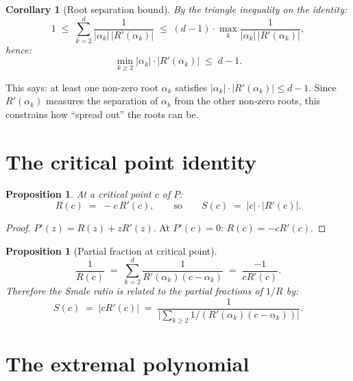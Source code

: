 \documentclass[11pt,a4paper]{article}
\newtheorem{proposition}[theorem]{Proposition}
\newtheorem{corollary}[theorem]{Corollary}
\begin{document}
\begin{corollary}[Root separation bound]
By the triangle inequality on the identity:
\begin{equation}
1 \;\le\; \sum_{k=2}^d \frac{1}{|\alpha_k|\, |R'(\alpha_k)|} \;\le\; (d - 1) \cdot \max_k \frac{1}{|\alpha_k|\, |R'(\alpha_k)|},
\end{equation}
hence:
\begin{equation}
\boxed{\min_{k \ge 2} |\alpha_k| \cdot |R'(\alpha_k)| \;\le\; d - 1.}
\end{equation}
\end{corollary}

This says: at least one non-zero root $\alpha_k$ satisfies $|\alpha_k| \cdot |R'(\alpha_k)| \le d - 1$. Since $R'(\alpha_k)$ measures the separation of $\alpha_k$ from the other non-zero roots, this constrains how ``spread out'' the roots can be.

\section{The critical point identity}

\begin{proposition}
At a critical point $c$ of $P$:
\begin{equation}
R(c) \;=\; -c \, R'(c), \qquad \text{so} \qquad S(c) \;=\; |c| \cdot |R'(c)|.
\end{equation}
\end{proposition}

\begin{proof}
$P'(z) = R(z) + z R'(z)$. At $P'(c) = 0$: $R(c) = -c R'(c)$. \qedhere
\end{proof}

\begin{proposition}[Partial fraction at critical point]
\begin{equation}
\frac{1}{R(c)} \;=\; \sum_{k=2}^d \frac{1}{R'(\alpha_k)(c - \alpha_k)} \;=\; \frac{-1}{c R'(c)}.
\end{equation}
Therefore the Smale ratio is related to the partial fractions of $1/R$ by:
\begin{equation}
S(c) \;=\; |c R'(c)| \;=\; \frac{1}{\bigl|\sum_{k \ge 2} 1/(R'(\alpha_k)(c - \alpha_k))\bigr|}.
\end{equation}
\end{proposition}

\section{The extremal polynomial}
\end{document}
